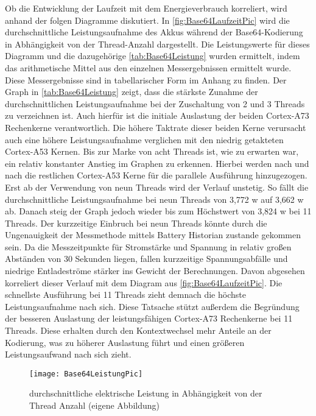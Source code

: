 Ob die Entwicklung der Laufzeit mit dem Energieverbrauch korreliert, wird anhand der folgen Diagramme diskutiert. In \autoref{fig:Base64LaufzeitPic} wird die durchschnittliche Leistungsaufnahme des Akkus während der Base64-Kodierung in Abhängigkeit von der Thread-Anzahl dargestellt. Die Leistungswerte für dieses Diagramm  und die dazugehörige \autoref{tab:Base64Leistung} wurden ermittelt, indem das arithmetische Mittel aus den einzelnen Messergebnissen ermittelt wurde. Diese Messergebnisse sind in tabellarischer Form im Anhang zu finden. Der Graph in \autoref{tab:Base64Leistung} zeigt, dass die stärkste Zunahme der durchschnittlichen Leistungsaufnahme bei der Zuschaltung von 2 und 3 Threads zu verzeichnen ist. Auch hierfür ist die initiale Auslastung der beiden Cortex-A73 Rechenkerne verantwortlich. Die höhere Taktrate dieser beiden Kerne verursacht auch eine höhere Leistungsaufnahme verglichen mit den niedrig getakteten Cortex-A53 Kernen. Bis zur Marke von acht Threads ist, wie zu erwarten war, ein relativ konstanter Anstieg im Graphen zu erkennen. Hierbei werden nach und nach die restlichen Cortex-A53 Kerne für die parallele Ausführung hinzugezogen. Erst ab der Verwendung von neun Threads wird der Verlauf unstetig. So fällt die durchschnittliche Leistungsaufnahme bei neun Threads von 3,772 \ac{w} auf 3,662 \ac{w} ab. Danach steig der Graph jedoch wieder bis zum Höchstwert von 3,824 \ac{w} bei 11 Threads. Der kurzzeitige Einbruch bei neun Threads könnte durch die  Ungenauigkeit der Messmethode mittels Battery Historian zustande gekommen sein. Da die Messzeitpunkte für Stromstärke und Spannung in relativ großen Abständen von 30 Sekunden liegen, fallen kurzzeitige Spannungsabfälle und niedrige Entladeströme stärker ins Gewicht der Berechnungen. Davon abgesehen korreliert dieser Verlauf mit dem Diagram aus \autoref{fig:Base64LaufzeitPic}. Die schnellste Ausführung bei 11 Threads zieht demnach die höchste Leistungsaufnahme nach sich. Diese Tatsache stützt außerdem die Begründung der besseren Auslastung der leistungsfähigen Cortex-A73 Rechenkerne bei 11 Threads. Diese erhalten durch den Kontextwechsel mehr Anteile an der Kodierung, was zu höherer Auslastung führt und einen größeren Leistungsaufwand nach sich zieht.



\begin{figure}[h]
	\begin{center}	 
	\texttt{[image: Base64LeistungPic]}
	\caption{durchschnittliche elektrische Leistung in Abhängigkeit von der Thread Anzahl (eigene Abbildung)}
	\label{fig:Base64LeistungPic} 
	\end{center}
\end{figure}

